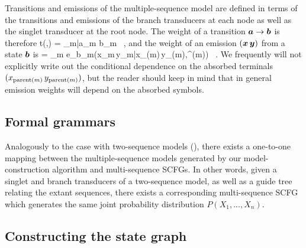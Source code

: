 \documentclass[10pt]{article}
\begin{document}
Transitions and emissions of the multiple-sequence model are defined in terms of the transitions and emissions 
of the branch transducers at each node as well as the singlet transducer at the root node.
The weight of a transition $\boldsymbol{a} \to \boldsymbol{b}$ is therefore
\beqn
t(,) = \prod_{m|a_m \ne b_m}  \, ,
\eeqn
and the weight of an emission $(\boldsymbol{x}\,\boldsymbol{y})$ from a state $\boldsymbol{b}$ is
\beqn
{} = \prod_m e_{b_m}\left(x_m\,y_m|x_{\parent(m)}\,y_{\parent(m)},\theta^{(m)}\right) \, .
\eeqn
We frequently will not explicitly write out the conditional dependence on the absorbed terminals $(x_{\operatorname{parent}(m)}\,y_{\operatorname{parent}(m)})$,
but the reader should keep in mind that in general emission weights will depend on the absorbed symbols.

\subsection{Formal grammars} 

Analogously to the case with two-sequence models (),
there exists a one-to-one mapping between the multiple-sequence models generated by our model-construction algorithm 
and multi-sequence SCFGs.
In other words, given a singlet and branch transducers of a two-sequence model, as well
as a guide tree relating the extant sequences, there exists a corresponding multi-sequence SCFG
which generates the same joint probability distribution $P(X_1 , ... , X_n)$.



\subsection{Constructing the state graph} 
\end{document}
